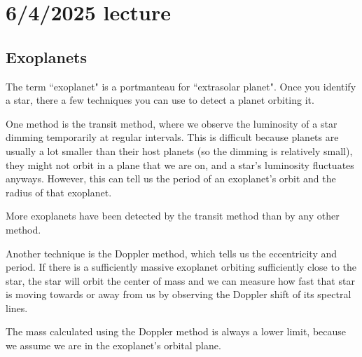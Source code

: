 \documentclass[class=article, crop=false]{standalone}
\begin{document}
\section{6/4/2025 lecture}
\subsection{Exoplanets}
The term ``exoplanet" is a portmanteau for ``extrasolar planet". Once you identify a star, there a few techniques you can use to detect a planet orbiting it.
\par
One method is the transit method, where we observe the luminosity of a star dimming temporarily at regular intervals. This is difficult because planets are usually a lot smaller than their host planets (so the dimming is relatively small), they might not orbit in a plane that we are on, and a star's luminosity fluctuates anyways. However, this can tell us the period of an exoplanet's orbit and the radius of that exoplanet.
\par
More exoplanets have been detected by the transit method than by any other method.
\par
Another technique is the Doppler method, which tells us the eccentricity and period. If there is a sufficiently massive exoplanet orbiting sufficiently close to the star, the star will orbit the center of mass and we can measure how fast that star is moving towards or away from us by observing the Doppler shift of its spectral lines.
\par
The mass calculated using the Doppler method is always a lower limit, because we assume we are in the exoplanet's orbital plane.
\end{document}
